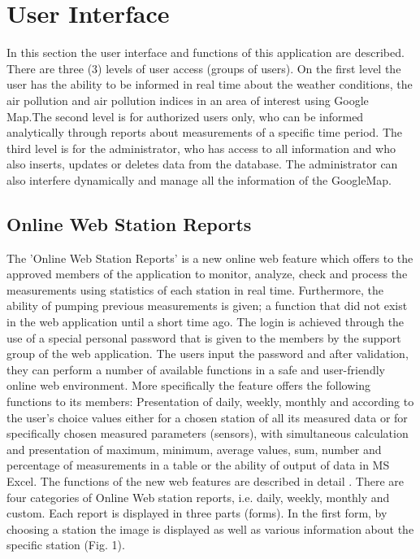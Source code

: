 \documentclass[conference]{IEEEtran}
\begin{document}
\section{User Interface}
In this section the user interface and functions of this application are described. There are three (3) levels of user access (groups of users). On the first level the user has the ability to be informed in real time about the weather conditions, the air pollution and air pollution indices in an area of interest using Google Map.The second level is for authorized users only, who can be informed analytically through reports about measurements of a specific time period. The third level is for the administrator, who has access to all information and who also inserts, updates or deletes data from the database. The administrator can also interfere dynamically and manage all the information of the GoogleMap.


\subsection{Online Web Station Reports}
 
The 'Online Web Station Reports' is a new online web feature which offers  to the approved members of the application to monitor, analyze, check and process the measurements using statistics of each station in real time. Furthermore, the ability of pumping previous measurements is given; a function that did not exist in the web application until a short time ago.
	The login  is achieved through the use of a special personal password that is given to the members by the support group of the web application. The users input  the password and after validation, they can perform a number of available functions in a safe and user-friendly online web environment.
More specifically the feature offers the following functions to its members:
Presentation of daily, weekly, monthly and according to the user's choice values either for a chosen station of all its measured data or for specifically chosen measured parameters (sensors), with simultaneous calculation and presentation of maximum, minimum, average values, sum, number and percentage of measurements in a table or the ability of output of data in MS Excel. The functions of the new web features are described in detail .
There are four categories of Online Web station reports, i.e. daily, weekly, monthly and custom. Each report is displayed in three parts (forms). In the first form, by choosing a station the image is displayed as well as various information about the specific station (Fig. 1).
\end{document}
